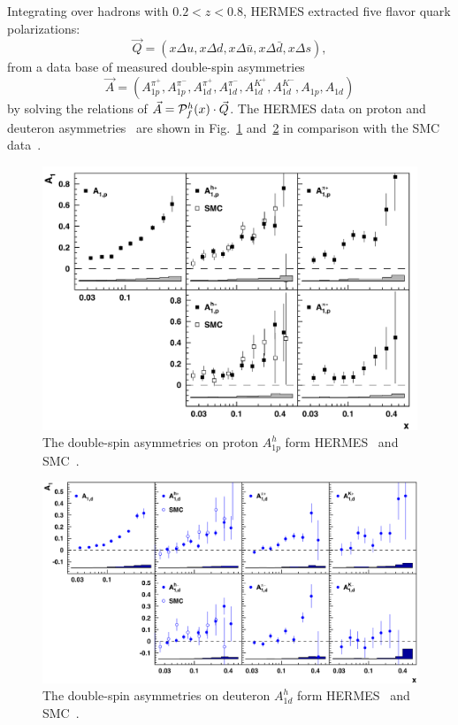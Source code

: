 Integrating over hadrons with $0.2<z<0.8$, HERMES extracted five flavor quark polarizations:
\begin{equation}
\vec Q = \left( x \Delta u , x \Delta d ,  x \Delta \bar{u},  x \Delta \bar{d},  
x \Delta {s} \right),
\end{equation}  
from a data base of measured double-spin asymmetries
\begin{equation}
 \vec A= \left( A_{1p}^{\pi^+}, A_{1p}^{\pi^-}, A_{1d}^{\pi^+}, A_{1d}^{\pi^-},
  A_{1d}^{K^+}, A_{1d}^{K^-}, A_{1p}, A_{1d}\right)
\end{equation}  
by solving the relations of $\vec A= {\cal P}_f^h(x)  \cdot \vec Q$. The HERMES data on 
proton and deuteron asymmetries~\cite{hermes2002}
are shown in Fig.~\ref{fig:ahermesp} and~\ref{fig:ahermesd} 
in comparison with the SMC data~\cite{smc1998}. 
\begin{figure}[htbp]
  \centering
    \includegraphics[width=0.90\linewidth]{./figs_xj/hermes_prd_A1p-all.pdf}
\caption{\label{fig:ahermesp} The double-spin asymmetries on proton   $A_{1p}^h$ form HERMES~\protect\cite{Airapetian:2004zf}
 and SMC~\protect\cite{Adeva:1997qz}. 
}
\end{figure}
\begin{figure}[htbp]
  \centering
    \includegraphics[width=0.90\linewidth]{./figs_xj/hermes_prd_A1d-all_color.pdf}
\caption{\label{fig:ahermesd} The double-spin asymmetries on deuteron 
 $A_{1d}^h$ form HERMES~\protect\cite{Airapetian:2004zf}
 and SMC~\protect\cite{Adeva:1997qz}. 
}
\end{figure}
